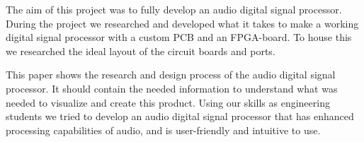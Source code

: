 The aim of this project was to fully develop an audio digital signal processor. During the project we researched and developed what it takes to make a working digital signal processor with a custom PCB and an FPGA-board. To house this we researched the ideal layout of the circuit boards and ports. 
\par
\noindent This paper shows the research and design process of the audio digital signal processor. It should contain the needed information to understand what was needed to visualize and create this product. 
Using our skills as engineering students we tried to develop an audio digital signal processor that has enhanced processing capabilities of audio, and is user-friendly and intuitive to use. 